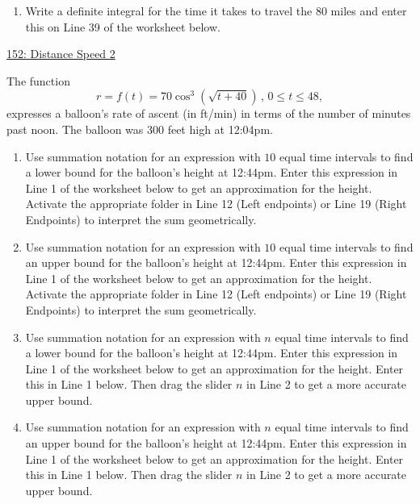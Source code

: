 \documentclass{ximera}
\begin{document}
\begin{question}
\begin{enumerate}
\item Write a definite integral for the time it takes to travel the $80$ miles and enter this on Line 39 of the worksheet below.


\end{enumerate}

\begin{onlineOnly}
    \begin{center}
\end{center}
\end{onlineOnly}
 
\href{https://www.desmos.com/calculator/k10phbukon}{152: Distance Speed 2}
\end{question}

\begin{question} \label{QOErermern333}
The function
\[
 r = f(t) = 70 \cos^3\left( \sqrt{t+40} \right)\, , \, 0\leq t \leq 48,
\]
expresses a balloon’s rate of ascent (in ft/min) in terms of the number of minutes past noon. The balloon was 300 feet high at 12:04pm.

\begin{enumerate}
\item Use summation notation for an expression with $10$ equal time intervals to find a lower bound for the balloon's height at 12:44pm. Enter this expression in Line 1 of the worksheet below to get an  approximation for the height. Activate the appropriate folder in Line 12 (Left endpoints) or Line 19 (Right Endpoints) to interpret the sum geometrically.

\item Use summation notation for an expression with $10$ equal time intervals to find an upper bound for the balloon's height at 12:44pm. Enter this expression in Line 1 of the worksheet below to get an  approximation for the  height. Activate the appropriate folder in Line 12 (Left endpoints) or Line 19 (Right Endpoints) to interpret the sum geometrically.


\item Use summation notation for an expression with $n$ equal time intervals to find a lower bound for the balloon's height at 12:44pm. Enter this expression in Line 1 of the worksheet below to get an  approximation for the height. Enter this in Line 1 below. Then drag the slider $n$ in Line 2 to get a more accurate upper bound.

\item Use summation notation for an expression with $n$ equal time intervals to find an upper bound for the balloon's height at 12:44pm. Enter this expression in Line 1 of the worksheet below to get an  approximation for the height. Enter this in Line 1 below. Then drag the slider $n$ in Line 2 to get a more accurate upper bound.


\end{enumerate}
\end{question}
\end{document}
